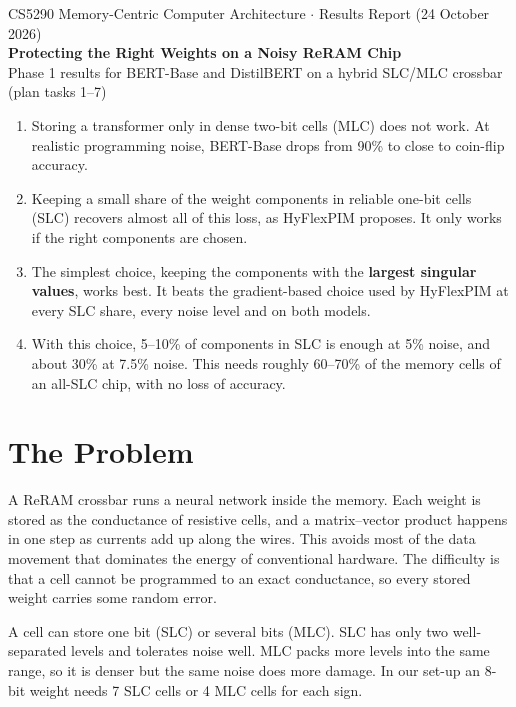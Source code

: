 \documentclass[10pt,a4paper]{article}
\begin{document}
\begin{center}
{\small CS5290 Memory-Centric Computer Architecture $\cdot$ Results Report (24 October 2026)}\\[6pt]
{\LARGE\bfseries Protecting the Right Weights on a Noisy ReRAM Chip}\\[6pt]
{\large Phase 1 results for BERT-Base and DistilBERT on a hybrid SLC/MLC crossbar (plan tasks 1--7)}
\end{center}

\begin{tcolorbox}[colback=keybg,colframe=accent,boxrule=0.5pt,arc=1pt,left=6pt,right=6pt,top=4pt,bottom=4pt,
  title={Main findings},fonttitle=\bfseries\small,coltitle=white]
\begin{enumerate}[leftmargin=*]
\item Storing a transformer only in dense two-bit cells (MLC) does not work. At realistic programming
noise, BERT-Base drops from 90\% to close to coin-flip accuracy.
\item Keeping a small share of the weight components in reliable one-bit cells (SLC) recovers almost all of
this loss, as HyFlexPIM proposes. It only works if the right components are chosen.
\item The simplest choice, keeping the components with the \textbf{largest singular values}, works best. It
beats the gradient-based choice used by HyFlexPIM at every SLC share, every noise level and on both
models.
\item With this choice, 5--10\% of components in SLC is enough at 5\% noise, and about 30\% at 7.5\% noise.
This needs roughly 60--70\% of the memory cells of an all-SLC chip, with no loss of accuracy.
\end{enumerate}
\end{tcolorbox}

\section{The Problem}
A ReRAM crossbar runs a neural network inside the memory. Each weight is stored as the conductance of
resistive cells, and a matrix--vector product happens in one step as currents add up along the wires.
This avoids most of the data movement that dominates the energy of conventional hardware. The difficulty
is that a cell cannot be programmed to an exact conductance, so every stored weight carries some random
error.

A cell can store one bit (SLC) or several bits (MLC). SLC has only two well-separated levels and
tolerates noise well. MLC packs more levels into the same range, so it is denser but the same noise does
more damage. In our set-up an 8-bit weight needs 7 SLC cells or 4 MLC cells for each sign.
\end{document}
